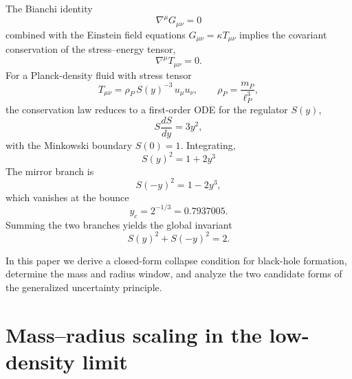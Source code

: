 \documentclass[a4paper,1pt,oneside,openany]{book}
\begin{document}
The Bianchi identity
\begin{equation}
\nabla^{\mu}G_{\mu\nu}=0
\label{eq:bianchi}
\end{equation}
combined with the Einstein field equations $G_{\mu\nu}=\kappa 
T_{\mu\nu}$ implies the covariant conservation of the 
stress--energy tensor,
\begin{equation}
\nabla^{\mu}T_{\mu\nu}=0.
\label{eq:conservation}
\end{equation}
For a Planck-density fluid with stress tensor
\begin{equation}
T_{\mu\nu}=\rho_{P}\,S(y)^{-3}\,u_{\mu}u_{\nu},
\qquad
\rho_{P}=\frac{m_{P}}{\ell_{P}^{3}},
\label{eq:stress}
\end{equation}
the conservation law reduces to a first-order ODE for the 
regulator $S(y)$,
\begin{equation}
S\frac{dS}{dy}=3y^{2},
\label{eq:ODE}
\end{equation}
with the Minkowski boundary $S(0)=1$. Integrating,
\begin{equation}
\boxed{\;S(y)^{2}=1+2y^{3}\;}
\label{eq:S2}
\end{equation}
The mirror branch is
\begin{equation}
S(-y)^{2}=1-2y^{3},
\label{eq:Smirror}
\end{equation}
which vanishes at the bounce
\begin{equation}
y_{c}=2^{-1/3}=0.7937005.
\label{eq:yc}
\end{equation}
Summing the two branches yields the global invariant
\begin{equation}
\boxed{\;S(y)^{2}+S(-y)^{2}=2.\;}
\label{eq:invariant}
\end{equation}

In this paper we derive a closed-form collapse condition for 
black-hole formation, determine the mass and radius window, and 
analyze the two candidate forms of the generalized uncertainty 
principle.

\section{Mass--radius scaling in the low-density limit}
\end{document}
